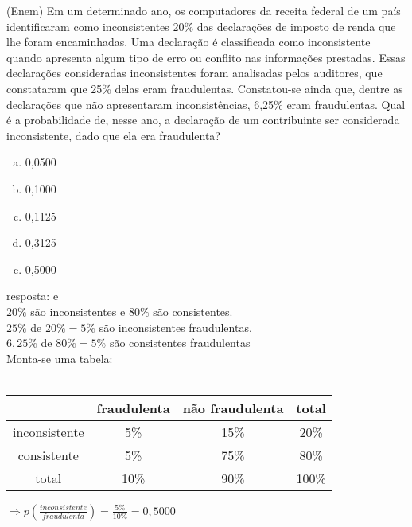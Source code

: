 \begin{ex}
 (Enem) Em um determinado ano, os computadores da receita federal de um país identificaram como inconsistentes 20\% das declarações de imposto de renda que lhe foram encaminhadas. Uma declaração é classificada como inconsistente quando apresenta algum tipo de erro ou conflito nas informações prestadas. Essas declarações consideradas inconsistentes foram analisadas pelos auditores, que constataram que 25\% delas eram fraudulentas. Constatou-se ainda que, dentre as declarações que não apresentaram inconsistências, 6,25\% eram fraudulentas. Qual é a probabilidade de, nesse ano, a declaração de um contribuinte ser considerada inconsistente, dado que ela era fraudulenta? 
   \begin{enumerate} [(a)]
       \item 0,0500
       \item 0,1000
       \item 0,1125
       \item 0,3125
       \item 0,5000
   \end{enumerate}
      \begin{sol}
      resposta: e \\
      $20\%$ são inconsistentes e $80\%$ são consistentes. \\
      $25\%$ de $20\%=5\%$ são inconsistentes fraudulentas.\\
      $6,25\%$ de $80\%= 5\%$ são consistentes fraudulentas\\
      Monta-se uma tabela:  \\ \\
      \begin{tabular}{c|c|c|c} \hline
           & fraudulenta & não fraudulenta & total \\   \hline
     inconsistente  &  5\% & 15\% & 20\%  \\  \hline
     consistente &5\% &75\% &80\% \\  \hline
     total & 10\%  & 90\% & 100\% \\   \hline
      \end{tabular}
      $\Longrightarrow p(\frac{inconsistente}{fraudulenta})=\frac{5\%}{10\%}=0,5000$
      \end{sol}
 \end{ex}